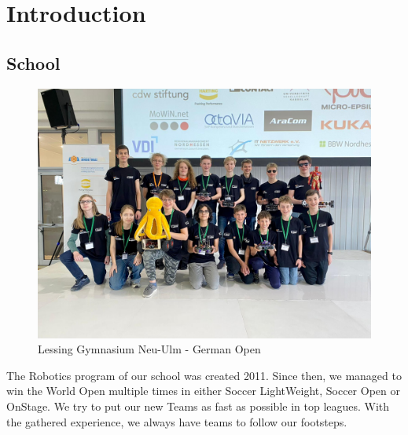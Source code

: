 \section{Introduction}

\subsection{School}
\begin{figure}[ht]
    \centering
    \includegraphics[width=\textwidth]{img/LGNU.jpg}
    \caption{Lessing Gymnasium Neu-Ulm - German Open}
    \label{fig:LGNU}
\end{figure}

\makeatletter
\providecommand{\rowno}[1][__empty__]{%
\ifthenelse{\isundefined{\c@rowno}}{%
\newcounter{rowno}}{}%
\ifthenelse{\equal{#1}{__empty__}}{%
\stepcounter{rowno}%
}{%
\setcounter{rowno}{#1}%
}%
\therowno.%
}
\makeatother

The Robotics program of our school was created 2011. Since then, we managed to win the World Open
multiple times in either Soccer LightWeight, Soccer Open or OnStage.
We try to put our new Teams as fast as possible in top leagues. With the gathered experience, we always
have teams to follow our footsteps.
\newpage


